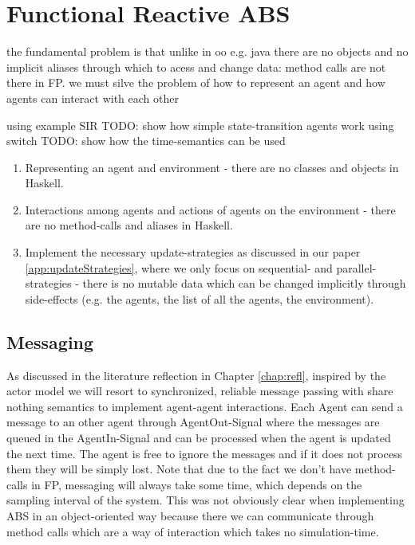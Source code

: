 \section{Functional Reactive ABS}
the fundamental problem is that unlike in oo e.g. java there are no objects and no implicit aliases through which to acess and change data: method calls are not there in FP. we must silve the problem of how to represent an agent and how agents can interact with each other

using example SIR
TODO: show how simple state-transition agents work using switch
TODO: show how the time-semantics can be used

\begin{enumerate}
	\item Representing an agent and environment - there are no classes and objects in Haskell.
	\item Interactions among agents and actions of agents on the environment - there are no method-calls and aliases in Haskell.
	\item Implement the necessary update-strategies as discussed in our paper \ref{app:updateStrategies}, where we only focus on sequential- and parallel-strategies - there is no mutable data which can be changed implicitly through side-effects (e.g. the agents, the list of all the agents, the environment).
\end{enumerate}

\subsection{Messaging}
As discussed in the literature reflection in Chapter \ref{chap:refl}, inspired by the actor model we will resort to synchronized, reliable message passing with share nothing semantics to implement agent-agent interactions. Each Agent can send a message to an other agent through AgentOut-Signal where the messages are queued in the AgentIn-Signal and can be processed when the agent is updated the next time. The agent is free to ignore the messages and if it does not process them they will be simply lost.
Note that due to the fact we don't have method-calls in FP, messaging will always take some time, which depends on the sampling interval of the system. This was not obviously clear when implementing ABS in an object-oriented way because there we can communicate through method calls which are a way of interaction which takes no simulation-time.


